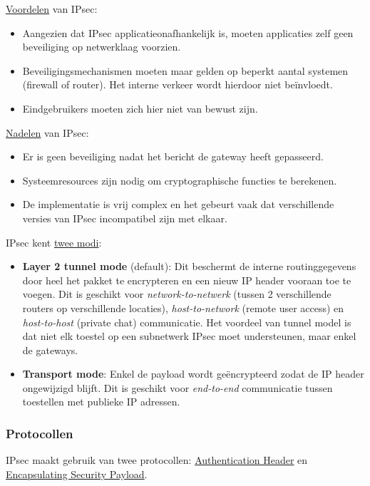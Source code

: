 \documentclass{report}
\begin{document}
	\underline{Voordelen} van IPsec:
	\begin{itemize}
		\item Aangezien dat IPsec applicatieonafhankelijk is, moeten applicaties zelf geen beveiliging op netwerklaag voorzien.
		\item Beveiligingsmechanismen moeten maar gelden op beperkt aantal systemen (firewall of router). Het interne verkeer wordt hierdoor niet beïnvloedt.
		\item Eindgebruikers moeten zich hier niet van bewust zijn.
	\end{itemize}

	\underline{Nadelen} van IPsec:
	\begin{itemize}
		\item Er is geen beveiliging nadat het bericht de gateway heeft gepasseerd.
		\item Systeemresources zijn nodig om cryptographische functies te berekenen.
		\item De implementatie is vrij complex en het gebeurt vaak dat verschillende versies van IPsec incompatibel zijn met elkaar.
	\end{itemize}

	IPsec kent \underline{twee modi}:
	\begin{itemize}
		\item \textbf{Layer 2 tunnel mode} (default): Dit beschermt de interne routinggegevens door heel het pakket te encrypteren en een nieuw IP header vooraan toe te voegen. Dit is geschikt voor \emph{network-to-netwerk} (tussen 2 verschillende routers op verschillende locaties), \emph{host-to-network} (remote user access) en \emph{host-to-host} (private chat) communicatie. Het voordeel van tunnel model is dat niet elk toestel op een subnetwerk IPsec moet understeunen, maar enkel de gateways.
		\item \textbf{Transport mode}:  Enkel de payload wordt geëncrypteerd zodat de IP header ongewijzigd blijft. Dit is geschikt voor \emph{end-to-end} communicatie tussen toestellen met publieke IP adressen.
	\end{itemize}
	
	\subsubsection{Protocollen}
	IPsec maakt gebruik van twee protocollen: \underline{Authentication Header} en \underline{Encapsulating Security Payload}.
\end{document}
